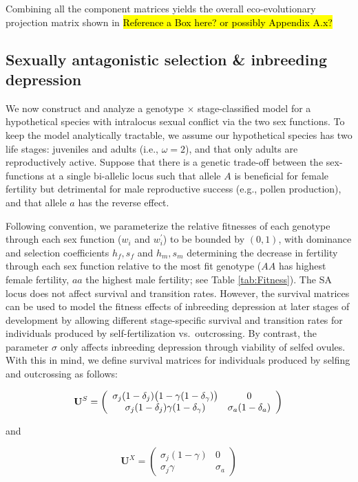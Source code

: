 \documentclass[11pt]{article}
\def\mbf#1{\mathbf{#1}}
\begin{document}
Combining all the component matrices yields the overall eco-evolutionary projection matrix shown in \hl{Reference a Box here?  or possibly Appendix A.x?}


\subsection*{Sexually antagonistic selection \& inbreeding depression} \label{sec:SAsel}

We now construct and analyze a genotype $\times$ stage-classified model for a hypothetical species with intralocus sexual conflict via the two sex functions. To keep the model analytically tractable, we assume our hypothetical species has two life stages: juveniles and adults (i.e., $\omega = 2$), and that only adults are reproductively active. Suppose that there is a genetic trade-off between the sex-functions at a single bi-allelic locus such that allele $A$ is beneficial for female fertility but detrimental for male reproductive success (e.g., pollen production), and that allele $a$ has the reverse effect. 

Following convention, we parameterize the relative fitnesses of each genotype through each sex function ($w_{i}$ and $w^{\prime}_{i}$) to be bounded by $(0,1)$, with dominance and selection coefficients $h_f, s_f$ and $h_m, s_m$ determining the decrease in fertility through each sex function relative to the most fit genotype ($AA$ has highest female fertility, $aa$ the highest male fertility; see Table \ref{tab:Fitness}). The SA locus does not affect survival and transition rates. However, the survival matrices can be used to model the fitness effects of inbreeding depression at later stages of development by allowing different stage-specific survival and transition rates for individuals produced by self-fertilization vs.~outcrossing. By contrast, the parameter $\sigma$ only affects inbreeding depression through viability of selfed ovules. With this in mind, we define survival matrices for individuals produced by selfing and outcrossing as follows:
\begin{linenomath*}
\begin{equation} \label{eq:US}
	\mbf{U}^S = \left(
					\begin{array}{cc}
						\sigma_j (1 - \delta_j) \big(1 - \gamma (1 - \delta_{\gamma}) \big) & 0 \\
						\sigma_j (1 - \delta_j) \gamma (1 - \delta_{\gamma})      & \sigma_a (1 - \delta_a)
					\end{array}
				\right) \\
\end{equation}
\end{linenomath*}
\noindent and 
\begin{linenomath*}
\begin{equation}\label{eq:UX}
	\mbf{U}^X = \left(
					\begin{array}{cc}
						\sigma_j(1 - \gamma) & 0 \\
						\sigma_j \gamma      & \sigma_a
					\end{array}
				\right)
\end{equation}
\end{linenomath*}
\end{document}
